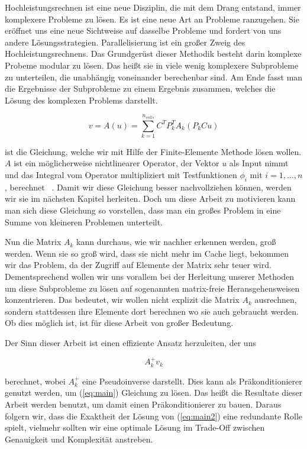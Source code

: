 Hochleistungsrechnen ist eine neue Disziplin, die mit dem Drang entstand, immer komplexere Probleme zu lösen. Es ist eine neue Art an Probleme ranzugehen. Sie eröffnet uns eine neue Sichtweise auf dasselbe Probleme und fordert von uns andere Lösungsstrategien.
Parallelisierung ist ein großer Zweig des Hochleistungsrechnens. Das Grundgerüst dieser Methodik besteht darin komplexe Probeme modular zu lösen. Das heißt sie in viele wenig komplexere Subprobleme zu unterteilen, die unabhängig voneinander berechenbar sind. Am Ende fasst man die Ergebnisse der Subprobleme zu einem Ergebnis zusammen, welches die Lösung des komplexen Problems darstellt.

\begin{equation} \label{eq:main}
v=A(u)=\sum_{k=1}^{n_{cells}} C^T P_k^T A_k (P_k Cu)
\end{equation}

ist die Gleichung, welche wir mit Hilfe der Finite-Elemente Methode lösen wollen. $A$ ist ein möglicherweise nichtlinearer Operator, der Vektor $u$ als Input nimmt und das Integral vom Operator multipliziert mit  Testfunktionen $\phi_i$ mit $i=1,\dots,n$, berechnet ~\cite[136]{Kronbichler}. Damit wir diese Gleichung besser nachvollziehen können, werden wir sie im nächsten Kapitel herleiten. Doch um diese Arbeit zu motivieren kann man sich diese Gleichung so vorstellen, dass man ein großes Problem in eine Summe von kleineren Problemen unterteilt. 

Nun die Matrix $A_k$ kann durchaus, wie wir nachher erkennen werden, groß werden. Wenn sie so groß wird, dass sie nicht mehr im Cache liegt, bekommen wir das Problem, da der Zugriff auf Elemente der Matrix sehr teuer wird. Dementsprechend wollen wir uns vorallem bei der Herleitung unserer Methoden um diese Subprobleme zu lösen auf sogenannten matrix-freie Heransgehensweisen konzentrieren. Das bedeutet, wir wollen nicht explizit die Matrix $A_k$ ausrechnen, sondern stattdessen ihre Elemente dort berechnen wo sie auch gebraucht werden. Ob dies möglich ist, ist für diese Arbeit von großer Bedeutung. 

Der Sinn dieser Arbeit ist einen effiziente Ansatz herzuleiten, der uns 

\begin{equation} \label{eq:main2}
A_k^{+}v_k
\end{equation}

berechnet, wobei $A_k^{+}$ eine Pseudoinverse darstellt. Dies kann als Präkonditionierer genutzt werden, um (\ref{eq:main}) Gleichung zu lösen. Das heißt die Resultate dieser Arbeit werden benutzt, um damit einen Präkonditionierer zu bauen. Daraus folgern wir, dass die Exaktheit der Lösung von (\ref{eq:main2}) eine redundante Rolle spielt, vielmehr sollten wir eine optimale Lösung im Trade-Off zwischen Genauigkeit und Komplexität anstreben.

